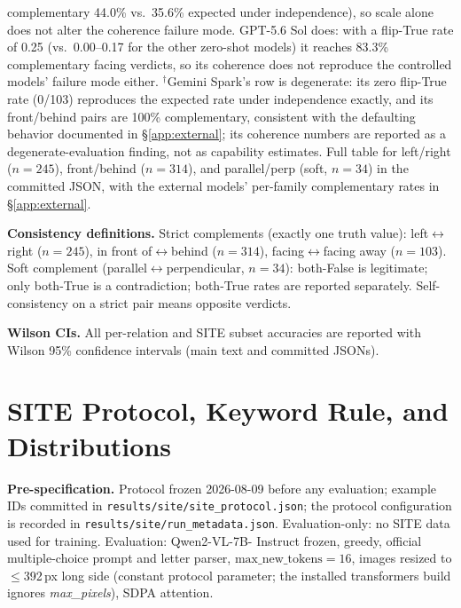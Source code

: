 complementary 44.0\% vs.\ 35.6\% expected under independence), so scale alone
does not alter the coherence failure mode. GPT-5.6 Sol does: with a flip-True
rate of 0.25 (vs.\ 0.00--0.17 for the other zero-shot models) it reaches
83.3\% complementary facing verdicts, so its coherence does not reproduce the
controlled models' failure mode either. $^{\dagger}$Gemini Spark's row is
degenerate: its zero flip-True rate (0/103) reproduces the expected rate under
independence exactly, and its front/behind pairs are 100\% complementary,
consistent with the defaulting behavior documented in
\S\ref{app:external}; its coherence numbers are reported as a
degenerate-evaluation finding, not as capability estimates. Full table for
left/right ($n{=}245$), front/behind ($n{=}314$), and parallel/perp (soft,
$n{=}34$) in the committed JSON, with the external models' per-family
complementary rates in \S\ref{app:external}.

\textbf{Consistency definitions.} Strict complements (exactly one truth value):
left$\leftrightarrow$right ($n{=}245$), in front of$\leftrightarrow$behind
($n{=}314$), facing$\leftrightarrow$facing away ($n{=}103$). Soft complement
(parallel$\leftrightarrow$perpendicular, $n{=}34$): both-False is legitimate;
only both-True is a contradiction; both-True rates are reported separately.
Self-consistency on a strict pair means opposite verdicts.

\textbf{Wilson CIs.} All per-relation and SITE subset accuracies are reported
with Wilson 95\% confidence intervals (main text and committed JSONs).

\section{SITE Protocol, Keyword Rule, and Distributions}
\label{app:site}

\textbf{Pre-specification.} Protocol frozen 2026-08-09 before any evaluation;
example IDs committed in \texttt{results/site/site\_protocol.json}; the
protocol configuration is recorded in \texttt{results/site/run\_metadata.json}.
Evaluation-only: no SITE data used for training. Evaluation: Qwen2-VL-7B-
Instruct frozen, greedy, official multiple-choice prompt and letter parser,
$\mathrm{max\_new\_tokens}{=}16$, images resized to $\le$392\,px long side
(constant protocol parameter; the installed transformers build ignores
\emph{max\_pixels}), SDPA attention.

